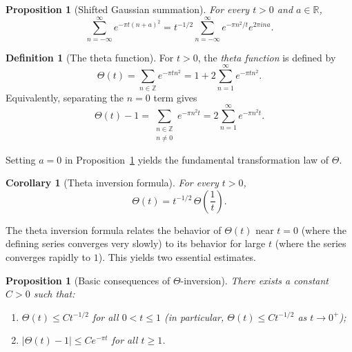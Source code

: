 \documentclass[11pt]{article}
\theoremstyle{plain}
\newtheorem{proposition}[theorem]{Proposition}
\newtheorem{corollary}[theorem]{Corollary}
\theoremstyle{definition}
\newtheorem{definition}[theorem]{Definition}
\theoremstyle{boldremark}
\theoremstyle{remark}
\numberwithin{equation}{section}
\newcommand{\R}{\mathbb{R}}
\newcommand{\Z}{\mathbb{Z}}
\begin{document}
\begin{proposition}[Shifted Gaussian summation]\label{prop:gaussian-poisson}
For every $t>0$ and $a\in\R$,
\begin{equation}\label{eq:gaussian-poisson}
 \sum_{n=-\infty}^{\infty} e^{-\pi t(n+a)^2}
 = t^{-1/2}\sum_{n=-\infty}^{\infty} e^{-\pi n^2/t} e^{2\pi i n a}.
\end{equation}
\end{proposition}

\begin{definition}[The theta function]
For $t>0$, the \emph{theta function} is defined by
\[
 \Theta(t) = \sum_{n\in\Z} e^{-\pi t n^2}
           = 1 + 2\sum_{n=1}^{\infty} e^{-\pi t n^2}.
\]
Equivalently, separating the $n=0$ term gives
\[
 \Theta(t) - 1 = \sum_{\substack{n\in\Z \\ n\neq 0}} e^{-\pi n^2 t}
               = 2\sum_{n=1}^{\infty} e^{-\pi n^2 t}.
\]
\end{definition}

Setting $a=0$ in Proposition~\ref{prop:gaussian-poisson} yields the
fundamental transformation law of $\Theta$.

\begin{corollary}[Theta inversion formula]\label{cor:theta-inversion}
For every $t>0$,
\begin{equation}\label{eq:theta-inversion}
 \boxed{\displaystyle
  \Theta(t) = t^{-1/2}\,\Theta\!\left(\frac{1}{t}\right).}
\end{equation}
\end{corollary}

The theta inversion formula relates the behavior of $\Theta(t)$ near $t=0$
(where the defining series converges very slowly) to its behavior for large
$t$ (where the series converges rapidly to $1$). This yields two essential
estimates.

\begin{proposition}[Basic consequences of $\Theta$-inversion]\label{prop:theta-bounds}
There exists a constant $C>0$ such that:
\begin{enumerate}[label=\textup{(\arabic*)}]
 \item $\Theta(t) \leq C t^{-1/2}$ for all $0<t\leq 1$ (in particular,
       $\Theta(t)\leq C t^{-1/2}$ as $t\to 0^+$);
 \item $|\Theta(t)-1| \leq C e^{-\pi t}$ for all $t\geq 1$.
\end{enumerate}
\end{proposition}
\end{document}
